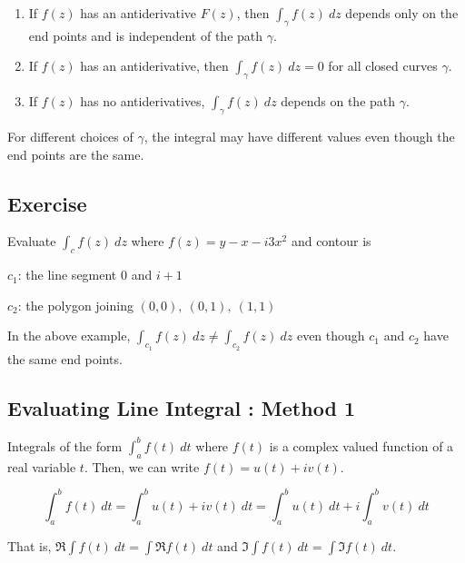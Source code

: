 
\begin{enumerate}
	\item If $f(z)$ has an antiderivative $F(z)$, then $\int_\gamma f(z)\ dz$ depends only on the end points and is independent of the path $\gamma$.
	\item If $f(z)$ has an antiderivative, then $\int_\gamma f(z)\ dz = 0$ for all closed curves $\gamma$.
	\item If $f(z)$ has no antiderivatives, $\int_\gamma f(z)\ dz$ depends on the path $\gamma$.
\end{enumerate}

	For different choices of $\gamma$, the integral may have different values even though the end points are the same.

\subsection{Exercise}
Evaluate $\int_c f(z)\ dz$ where $f(z) = y-x-i3x^2$ and contour is
\begin{itemize*}
	\item[$c_1$:]the line segment $0$ and $i+1$
	\item[$c_2$:] the polygon joining $(0,0),\ (0,1),\ (1,1)$ 
\end{itemize*}
In the above example, $\int_{c_1} f(z)\ dz \ne \int_{c_2}f(z)\ dz$ even though $c_1$ and $c_2$ have the same end points.

\subsection{Evaluating Line Integral : Method 1}
	Integrals of the form $\int_a^b f(t)\ dt$ where $f(t)$ is a complex valued function of a real variable $t$.
	Then, we can write $f(t) = u(t)+iv(t)$.

\[ \int_a^b f(t)\ dt = \int_a^b u(t) + iv(t)\ dt = \int_a^b u(t)\ dt + i\int_a^b v(t)\ dt \]

	That is, $\Re\int f(t)\ dt = \int \Re f(t)\ dt$ and $\Im\int f(t)\ dt = \int \Im f(t)\ dt$.

